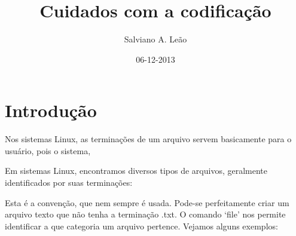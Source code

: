 \documentclass[a4paper,12pt,portuguese,oneside,final,notitlepage]{article}
\title{\textbf{Cuidados com a codificação}}
\author{Salviano A. Leão}
\date{06-12-2013}
\begin{document}
\maketitle

\section{Introdução}

Nos sistemas Linux, as terminações de um arquivo servem basicamente
para o usuário, pois o sistema,


Em sistemas Linux, encontramos diversos tipos de arquivos, geralmente 
identificados por suas terminações: 

Esta é a convenção, que nem sempre é usada. Pode-se perfeitamente criar 
um arquivo texto que não tenha a terminação .txt. O comando `file' nos permite 
identificar a que categoria um arquivo pertence. Vejamos alguns exemplos: 
\end{document}
